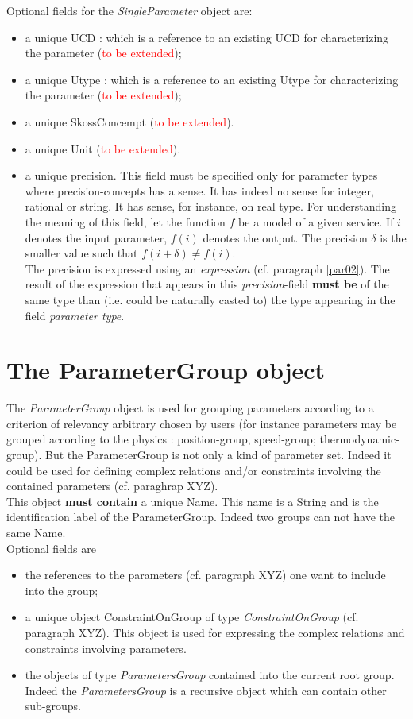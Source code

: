 \documentclass[11pt]{amsart}
\begin{document}
Optional fields for the {\it SingleParameter} object are:
\begin{itemize}
\item a unique UCD : which is a reference to an existing UCD for characterizing the parameter (\textcolor{red}{to be extended});
\item a unique Utype  : which is a reference to an existing Utype for characterizing the parameter (\textcolor{red}{to be extended});
\item a unique SkossConcempt (\textcolor{red}{to be extended}).
\item a unique Unit (\textcolor{red}{to be extended}).
\item a unique precision. This field must be specified only for parameter types where precision-concepts has a sense. It has indeed no sense for integer, rational or string. It has sense, for instance, on real type. For understanding the meaning of this field, let the function $f$ be a model of a given service. If $i$ denotes the input parameter, $f(i)$ denotes the output. The precision $\delta$ is the smaller value such that $f(i+\delta) \neq f(i)$.\\ The precision is expressed using an {\it expression} (cf. paragraph \ref{par02}). The result of the expression that appears in this {\it precision}-field  {\bf must be} of the same type than (i.e. could be naturally casted to) the type appearing in the field {\it parameter type}.
\end{itemize}

\section{The ParameterGroup object}\label{par-group}
The {\it ParameterGroup} object is used for grouping parameters according to a criterion of relevancy arbitrary chosen by users (for instance parameters may be grouped according to the physics : position-group, speed-group; thermodynamic-group).
But  the ParameterGroup is not only a kind of parameter set. Indeed it could be used for defining complex relations and/or constraints involving the contained parameters (cf. paraghrap XYZ).\\
This object {\bf must contain} a unique Name. This name is a String and is the identification label of the ParameterGroup. Indeed two groups can not have the same Name.\\
Optional fields are
\begin{itemize}
\item the references to the parameters (cf. paragraph XYZ) one want to include into the group;
\item a unique object ConstraintOnGroup of type {\it ConstraintOnGroup} (cf. paragraph XYZ). This object is used for 
expressing the complex relations and constraints involving parameters.
\item the objects of type {\it ParametersGroup} contained into the current root group. Indeed the {\it ParametersGroup} is a recursive object which can contain other sub-groups.
\end{itemize}
\end{document}
